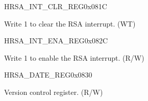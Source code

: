 \begin{register}{H}{RSA\_INT\_CLR\_REG}{0x081C}\label{regdesc:RSAINTCLRREG}
%
%
\regnewline%
\begin{regdesc}\begin{reglist}
\label{fielddesc:RSACLEARINTERRUPT}\item [RSA\_CLEAR\_INTERRUPT] Write 1 to clear the RSA interrupt. (WT)
\end{reglist}\end{regdesc}
\end{register}


\begin{register}{H}{RSA\_INT\_ENA\_REG}{0x082C}\label{regdesc:RSAINTENAREG}
%
%
\regnewline%
\begin{regdesc}\begin{reglist}
\label{fielddesc:RSAINTENA}\item [RSA\_INT\_ENA] Write 1 to enable the RSA interrupt. (R/W)
\end{reglist}\end{regdesc}
\end{register}


\begin{register}{H}{RSA\_DATE\_REG}{0x0830}\label{regdesc:RSADATEREG}
%
%
\regnewline%
\begin{regdesc}\begin{reglist}
\label{fielddesc:RSADATE}\item [RSA\_DATE] Version control register. (R/W)
\end{reglist}\end{regdesc}
\end{register}
